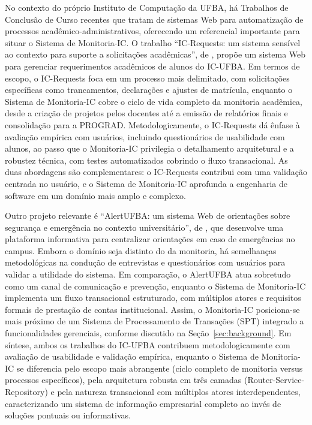 \documentclass[portuguese]{sbc2025}%
\begin{document}
No contexto do próprio Instituto de Computação da UFBA, há Trabalhos de Conclusão de Curso recentes que tratam de sistemas Web para automatização de processos acadêmico-administrativos, oferecendo um referencial importante para situar o Sistema de Monitoria-IC. O trabalho ``IC-Requests: um sistema sensível ao contexto para suporte a solicitações acadêmicas'', de \citet{machado2024icrequests}, propõe um sistema Web para gerenciar requerimentos acadêmicos de alunos do IC-UFBA. Em termos de escopo, o IC-Requests foca em um processo mais delimitado, com solicitações específicas como trancamentos, declarações e ajustes de matrícula, enquanto o Sistema de Monitoria-IC cobre o ciclo de vida completo da monitoria acadêmica, desde a criação de projetos pelos docentes até a emissão de relatórios finais e consolidação para a PROGRAD. Metodologicamente, o IC-Requests dá ênfase à avaliação empírica com usuários, incluindo questionários de usabilidade com alunos, ao passo que o Monitoria-IC privilegia o detalhamento arquitetural e a robustez técnica, com testes automatizados cobrindo o fluxo transacional. As duas abordagens são complementares: o IC-Requests contribui com uma validação centrada no usuário, e o Sistema de Monitoria-IC aprofunda a engenharia de software em um domínio mais amplo e complexo.

Outro projeto relevante é ``AlertUFBA: um sistema Web de orientações sobre segurança e emergência no contexto universitário'', de \citet{santos2023alertufba}, que desenvolve uma plataforma informativa para centralizar orientações em caso de emergências no campus. Embora o domínio seja distinto do da monitoria, há semelhanças metodológicas na condução de entrevistas e questionários com usuários para validar a utilidade do sistema. Em comparação, o AlertUFBA atua sobretudo como um canal de comunicação e prevenção, enquanto o Sistema de Monitoria-IC implementa um fluxo transacional estruturado, com múltiplos atores e requisitos formais de prestação de contas institucional. Assim, o Monitoria-IC posiciona-se mais próximo de um Sistema de Processamento de Transações (SPT) integrado a funcionalidades gerenciais, conforme discutido na Seção~\ref{sec:background}. Em síntese, ambos os trabalhos do IC-UFBA contribuem metodologicamente com avaliação de usabilidade e validação empírica, enquanto o Sistema de Monitoria-IC se diferencia pelo escopo mais abrangente (ciclo completo de monitoria versus processos específicos), pela arquitetura robusta em três camadas (Router-Service-Repository) e pela natureza transacional com múltiplos atores interdependentes, caracterizando um sistema de informação empresarial completo ao invés de soluções pontuais ou informativas.
\end{document}

